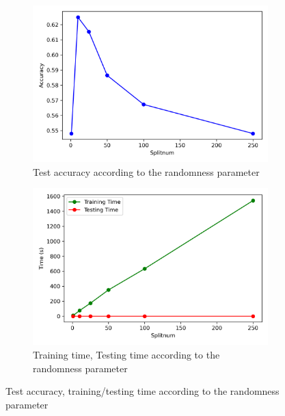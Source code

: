 \begin{figure}[t]
	\centering
	\begin{subfigure}[t]{0.4\linewidth}
		\centering
		\includegraphics[width=\linewidth]{image/q5-fig4.png}
		\caption{Test accuracy according to the randomness parameter}
		\label{fig:q5-fig4}
	\end{subfigure}%
	\quad
	\begin{subfigure}[t]{0.4\linewidth}
		\centering
		\includegraphics[width=\linewidth]{image/q5-fig5.png}
		\caption{Training time, Testing time according to the randomness parameter}
		\label{fig:q5-fig5}
	\end{subfigure}
	\caption{Test accuracy, training/testing time according to the randomness parameter}
\end{figure}

